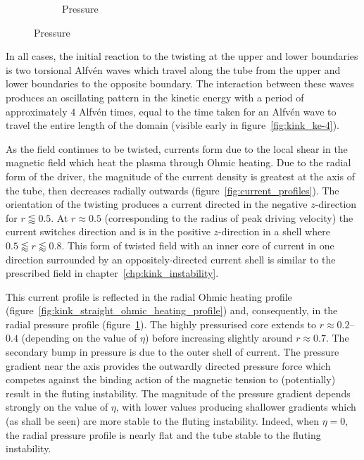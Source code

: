 \begin{figure}[t]
\begin{subfigure}{0.32\textwidth}
      \caption{Pressure}
      \label{fig:pressure_profiles}
    \end{subfigure}
  \label{fig:pressure_and_heating}
\end{figure}

In all cases, the initial reaction to the twisting at the upper and lower boundaries is two torsional Alfv\'en waves which travel along the tube from the upper and lower boundaries to the opposite boundary. The interaction between these waves produces an oscillating pattern in the kinetic energy with a period of approximately $4$ Alfv\'en times, equal to the time taken for an Alfv\'en wave to travel the entire length of the domain (visible early in figure~\ref{fig:kink_ke-4}).

As the field continues to be twisted, currents form due to the local shear in the magnetic field which heat the plasma through Ohmic heating. Due to the radial form of the driver, the magnitude of the current density is greatest at the axis of the tube, then decreases radially outwards (figure~\ref{fig:current_profiles}). The orientation of the twisting produces a current directed in the negative $z$-direction for $r\lessapprox0.5$. At $r \approx 0.5$ (corresponding to the radius of peak driving velocity) the current switches direction and is in the positive $z$-direction in a shell where $0.5\lessapprox r \lessapprox 0.8$. This form of twisted field with an inner core of current in one direction surrounded by an oppositely-directed current shell is similar to the prescribed field in chapter~\ref{chp:kink_instability}.

This current profile is reflected in the radial Ohmic heating profile (figure~\ref{fig:kink_straight_ohmic_heating_profile}) and, consequently, in the radial pressure profile (figure~\ref{fig:pressure_profiles}). The highly pressurised core extends to $r\approx 0.2$--$0.4$ (depending on the value of $\eta$) before increasing slightly around $r\approx 0.7$. The secondary bump in pressure is due to the outer shell of current. The pressure gradient near the axis provides the outwardly directed pressure force which competes against the binding action of the magnetic tension to (potentially) result in the fluting instability.  The magnitude of the pressure gradient depends strongly on the value of $\eta$, with lower values producing shallower gradients which (as shall be seen) are more stable to the fluting instability. Indeed, when $\eta=0$, the radial pressure profile is nearly flat and the tube stable to the fluting instability.

